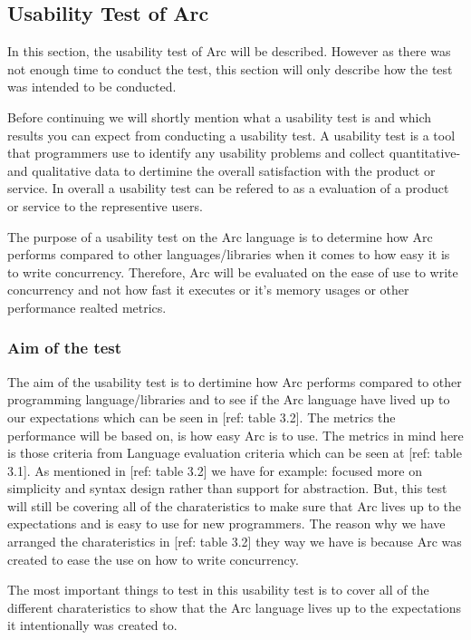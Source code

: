 \subsection{Usability Test of Arc}\label{subsec:usabilityTestOfArc}
In this section, the usability test of Arc will be described. However as there was not enough time to conduct the test, this section will only describe how the test was intended to be conducted.

Before continuing we will shortly mention what a usability test is and which results you can expect from conducting a usability test. A usability test is a tool that programmers use to identify any usability problems and collect quantitative- and qualitative data to dertimine the overall satisfaction with the product or service. In overall a usability test can be refered to as a evaluation of a product or service to the representive users.

The purpose of a usability test on the Arc language is to determine how Arc performs compared to other languages/libraries when it comes to how easy it is to write concurrency. Therefore, Arc will be evaluated on the ease of use to write concurrency and not how fast it executes or it's memory usages or other performance realted metrics.


\subsubsection{Aim of the test}\label{subsubsec:aimOfTheTest}
The aim of the usability test is to dertimine how Arc performs compared to other programming language/libraries and to see if the Arc language have lived up to our expectations which can be seen in [ref: table 3.2]. The metrics the performance will be based on, is how easy Arc is to use. The metrics in mind here is those criteria from Language evaluation criteria which can be seen at [ref: table 3.1]. As mentioned in [ref: table 3.2] we have for example: focused more on simplicity and syntax design rather than support for abstraction. But, this test will still be covering all of the charateristics to make sure that Arc lives up to the expectations and is easy to use for new programmers. The reason why we have arranged the charateristics in [ref: table 3.2] they way we have is because Arc was created to ease the use on how to write concurrency.

The most important things to test in this usability test is to cover all of the different charateristics to show that the Arc language lives up to the expectations it intentionally was created to.

